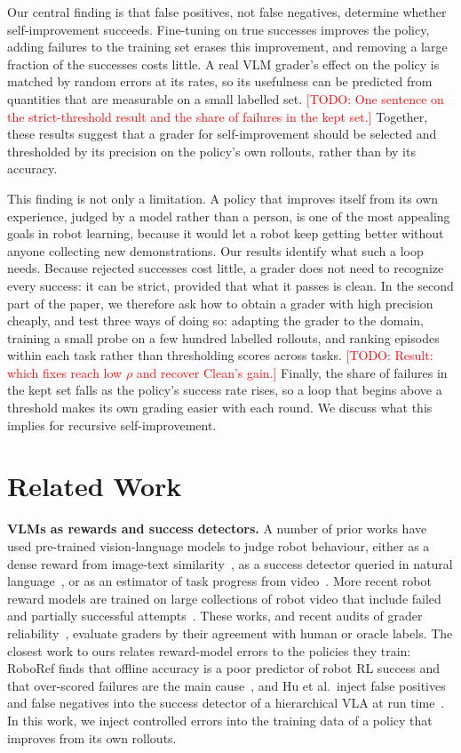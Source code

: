 \documentclass[letterpaper, journal, twoside]{IEEEtran}
\newcommand{\todo}[1]{\textcolor{red}{[TODO: #1]}}
\begin{document}
Our central finding is that false positives, not false negatives, determine whether self-improvement succeeds.
Fine-tuning on true successes improves the policy, adding failures to the training set erases this improvement, and
removing a large fraction of the successes costs little. A real VLM grader's effect on the policy is matched by random
errors at its rates, so its usefulness can be predicted from quantities that are measurable on a small labelled set.
\todo{One sentence on the strict-threshold result and the share of failures in the kept set.} Together, these results
suggest that a grader for self-improvement should be selected and thresholded by its precision on the policy's own
rollouts, rather than by its accuracy.

This finding is not only a limitation. A policy that improves itself from its own experience, judged by a model rather
than a person, is one of the most appealing goals in robot learning, because it would let a robot keep getting better
without anyone collecting new demonstrations. Our results identify what such a loop needs. Because rejected successes
cost little, a grader does not need to recognize every success: it can be strict, provided that what it passes is
clean. In the second part of the paper, we therefore ask how to obtain a grader with high precision cheaply, and test
three ways of doing so: adapting the grader to the domain, training a small probe on a few hundred labelled rollouts,
and ranking episodes within each task rather than thresholding scores across tasks. \todo{Result: which fixes reach
low $\rho$ and recover Clean's gain.} Finally, the share of failures in the kept set falls as the policy's success rate
rises, so a loop that begins above a threshold makes its own grading easier with each round. We discuss what this
implies for recursive self-improvement.

\section{Related Work}

\textbf{VLMs as rewards and success detectors.} A number of prior works have used pre-trained vision-language models to
judge robot behaviour, either as a dense reward from image-text similarity~\cite{vlmrm,roboclip}, as a success detector
queried in natural language~\cite{successvqa}, or as an estimator of task progress from video~\cite{gvl}. More recent
robot reward models are trained on large collections of robot video that include failed and partially successful
attempts~\cite{roboreward,robometer}. These works, and recent audits of grader reliability~\cite{failbench,tian2026bad},
evaluate graders by their agreement with human or oracle labels. The closest work to ours relates reward-model errors to
the policies they train: RoboRef finds that offline accuracy is a poor predictor of robot RL success and that
over-scored failures are the main cause~\cite{roboref}, and Hu et al.\ inject false positives and false negatives
into the success detector of a hierarchical VLA at run time~\cite{hu2026orchestrating}. In this work, we inject
controlled errors into the training data of a policy that improves from its own rollouts.
\end{document}
